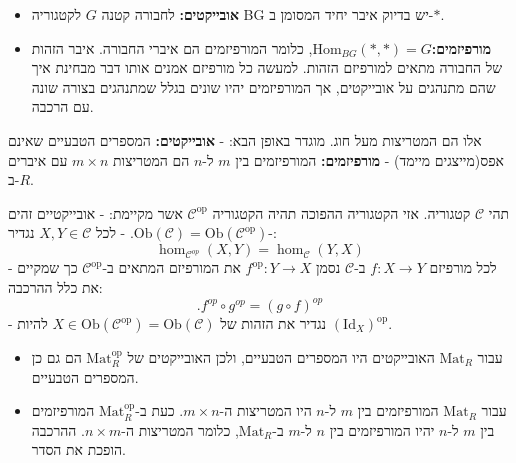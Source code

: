 \documentclass{tstextbook}
\begin{document}
\begin{definition}[הקטגוריה BG]
  \begin{itemize}
    \item \textbf{אובייקטים:} לחבורה קטנה \(G\) לקטגוריה BG יש בדיוק איבר יחיד המסומן ב-\(*\).
    \item \textbf{מורפיזמים:}\({\mathrm{Hom}}_{B G}(*,*)=G\), כלומר המורפיזמים הם איברי החבורה. איבר הזהות של החבורה מתאים למורפיזם הזהות.
למעשה כל מורפיזם אמנים אותו דבר מבחינת איך שהם מתנהגים על אובייקטים, אך המורפיזמים יהיו שונים בגלל שמתנהגים בצורה שונה עם הרכבה.
  \end{itemize}
\end{definition}
\begin{definition}
אלו הם המטריצות מעל חוג. מוגדר באופן הבא:
- \textbf{אובייקטים:} המספרים הטבעיים שאינם אפס(מייצגים מיימד)
- \textbf{מורפיזמים:} המורפיזמים בין \(m\) ל-\(n\) הם המטריצות \(m\times n\) עם איברים ב-\(R\).

\end{definition}
\begin{definition}
תהי \(\mathcal{C}\) קטגוריה. אזי הקטגוריה ההפוכה תהיה הקטגוריה \(\mathcal{C}^{\text{op}}\) אשר מקיימת:
- אובייקטיים זהים -\(\text{Ob}(\mathcal{C})=\text{Ob}(\mathcal{C}^{\text{op}})\).
- לכל \(X,Y\in \mathcal{C}\) נגדיר:
$$\hom_{{\mathcal{C}}^{o p}}\left(X,Y\right)=\hom_{{\mathcal{C}}}\left(Y,X\right)$$
- לכל מורפיזם \(f:X\to Y\) ב-\(\mathcal{C}\) נסמן \(f^{\text{op}}:Y\to X\) את המורפיזם המתאים ב-\(\mathcal{C}^{\text{op}}\) כך שמקיים את כלל ההרכבה:
$$.f^{o p}\circ g^{o p}=(g\circ f)^{o p}$$
- נגדיר את הזהות של \(X \in \mathrm{Ob}(\mathcal{C}^{\text{op}})=\mathrm{Ob}(\mathcal{C})\) להיות \((\mathrm{Id}_{X})^{\text{op}}\).

\end{definition}
\begin{example}
  \begin{itemize}
    \item עבור \(\text{Mat}_{R}\) האובייקטים היו המספרים הטבעיים, ולכן האובייקטים של \(\text{Mat}_{R}^{\text{op}}\) הם גם כן המספרים הטבעיים.
    \item עבור \(\text{Mat}_{R}\) המורפיזמים בין \(m\) ל-\(n\) היו המטריצות ה-\(m\times n\). כעת ב-\(\text{Mat}_{R}^{\text{op}}\) המורפיזמים בין \(m\) ל-\(n\) יהיו המורפיזמים בין \(n\) ל-\(m\) ב-\(\mathrm{Mat}_{R}\), כלומר המטריצות ה-\(n \times m\). ההרכבה הופכת את הסדר.
  \end{itemize}
\end{example}
\end{document}
